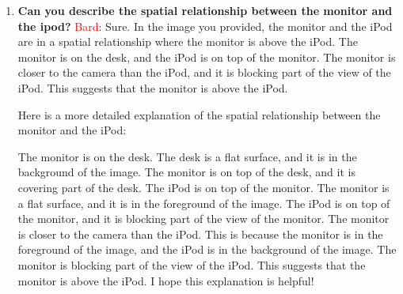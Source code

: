 \begin{enumerate}
    \item \textbf{Can you describe the spatial relationship between the monitor and the ipod?}
    \subitem \textcolor{Red}{Bard}: 
    Sure. In the image you provided, the monitor and the iPod are in a spatial relationship where the monitor is above the iPod. The monitor is on the desk, and the iPod is on top of the monitor. The monitor is closer to the camera than the iPod, and it is blocking part of the view of the iPod. This suggests that the monitor is above the iPod.
    
    Here is a more detailed explanation of the spatial relationship between the monitor and the iPod:
    
    The monitor is on the desk. The desk is a flat surface, and it is in the background of the image. The monitor is on top of the desk, and it is covering part of the desk.
    The iPod is on top of the monitor. The monitor is a flat surface, and it is in the foreground of the image. The iPod is on top of the monitor, and it is blocking part of the view of the monitor.
    The monitor is closer to the camera than the iPod. This is because the monitor is in the foreground of the image, and the iPod is in the background of the image.
    The monitor is blocking part of the view of the iPod. This suggests that the monitor is above the iPod.
    I hope this explanation is helpful!
    

\end{enumerate}

